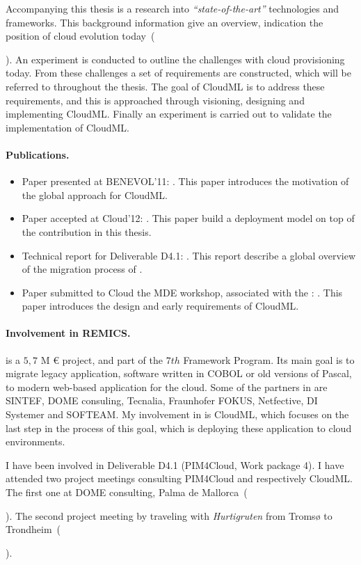 Accompanying this thesis is a research into \emph{``state-of-the-art''} technologies and frameworks.
This background information give an overview, 
indication the position of cloud evolution today~(\date{April 2012}).
An experiment is conducted to outline the challenges with cloud provisioning today.
From these challenges a set of requirements are constructed, which will be
referred to throughout the thesis.
The goal of CloudML is to address these requirements,
and this is approached through visioning, designing and implementing CloudML.
Finally an experiment is carried out to validate the implementation of CloudML.

\paragraph{Publications.}

\begin{itemize}
  \item
    Paper presented at BENEVOL'11:
    .
    This paper introduces the motivation of the global approach for CloudML.
  \item
    Paper accepted at Cloud'12:
    .
    This paper build a deployment model on top of the contribution in this thesis.
  \item 
    Technical report for Deliverable D4.1:
    .
    This report describe a global overview of the migration process of .
  \item
    Paper submitted to Cloud the MDE workshop, associated with the :
    .
    This paper introduces the design and early requirements of CloudML.
\end{itemize}

\paragraph{Involvement in REMICS.}

 is a $5,7$ M {\euro} project, and part of the $7th$ Framework Program.
Its main goal is to migrate legacy application,
\eg software written in COBOL or old versions of Pascal,
to modern web-based application for the cloud.
Some of the partners in  are SINTEF, DOME consuling, 
Tecnalia, Fraunhofer FOKUS, Netfective, DI Systemer and SOFTEAM.
My involvement in  is CloudML,
which focuses on the last step in the process of this goal,
which is deploying these application to cloud environments.

I have been involved in  Deliverable D4.1 (PIM4Cloud, Work package 4).
I have attended two project meetings consulting PIM4Cloud and respectively CloudML.
The first one at DOME consulting, Palma de Mallorca~(\date{June 2011}).
The second project meeting by traveling with \emph{Hurtigruten} from Troms{\o} to Trondheim~(\date{September 2011}).

